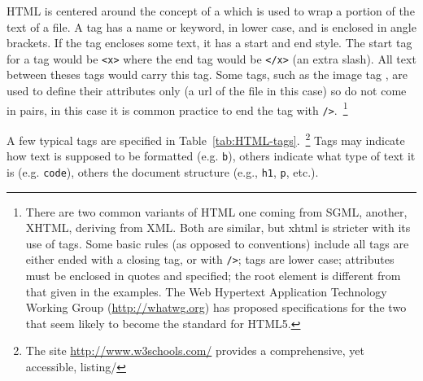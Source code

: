 HTML is centered around the concept of a  which is used to wrap a
portion of the text of a file. A tag has a name or keyword, in lower
case, and is enclosed in angle brackets. If the tag encloses some
text, it has a start and end style. The start tag for a tag 
would be \verb+<x>+ where the end tag would be \texttt{</x>} (an extra
slash). All text between theses tags would carry this tag. Some tags,
such as the image tag , are used to define their attributes
only (a url of the file in this case) so do not come in pairs, in this case it is
common practice to end the tag with \texttt{/>}.~\footnote{There are
  two common variants of HTML one coming from SGML, another, XHTML, deriving
  from XML. Both are similar, but xhtml is stricter with its use of
  tags. Some basic rules (as opposed to conventions) include all tags
  are either ended with a closing tag, or with \texttt{/>}; tags are
  lower case; attributes must be enclosed in quotes and specified; the
  root element is different from that given in the examples. The
  Web Hypertext Application Technology Working Group
  (\url{http://whatwg.org}) has proposed specifications for the two
  that seem likely to become the standard for HTML5.}

A few typical tags are specified in
Table~\ref{tab:HTML-tags}.~\footnote{The site
  \url{http://www.w3schools.com/} provides a comprehensive, yet
  accessible, listing/}
Tags may indicate how text is supposed to be formatted (e.g. \texttt{b}),
others indicate what type of text it is (e.g. \texttt{code}), others
the document structure (e.g., \texttt{h1}, \texttt{p}, etc.).

